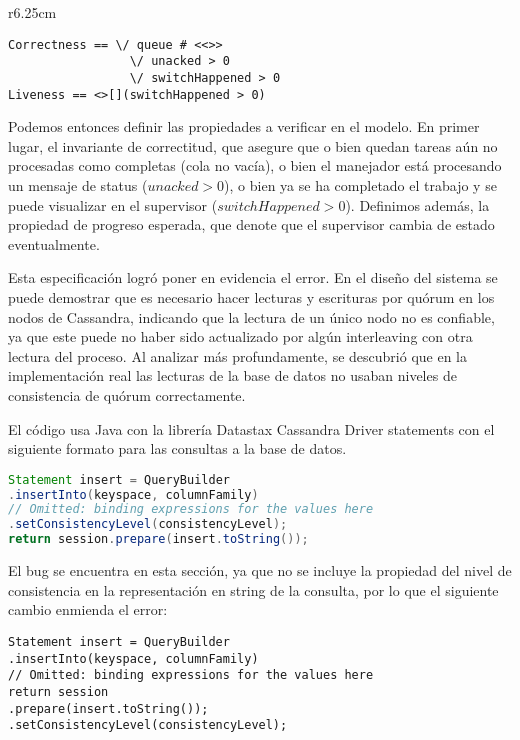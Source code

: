 \documentclass[runningheads]{llncs}
\begin{document}
\begin{wrapfigure}[7]{r}{6.25cm}
\vspace{-0.5cm}
\begin{lstlisting}
Correctness == \/ queue # <<>>
                 \/ unacked > 0
                 \/ switchHappened > 0    
Liveness == <>[](switchHappened > 0)
\end{lstlisting}
\end{wrapfigure}
Podemos entonces definir las propiedades a verificar en el modelo. En primer lugar, el invariante de correctitud, que asegure que o bien quedan tareas aún no procesadas como completas (cola no vacía), o bien el manejador está procesando un mensaje de status (\(unacked > 0\)), o bien ya se ha completado el trabajo y se puede visualizar en el supervisor (\(switchHappened > 0\)). Definimos además, la propiedad de progreso esperada, que denote que el supervisor cambia de estado eventualmente.

Esta especificación logró poner en evidencia el error. En el diseño del sistema se puede demostrar que es necesario hacer lecturas y escrituras por quórum en los nodos de Cassandra, indicando que la lectura de un único nodo no es confiable, ya que este puede no haber sido actualizado por algún interleaving con otra lectura del proceso. Al analizar más profundamente, se descubrió que en la implementación real las lecturas de la base de datos no usaban niveles de consistencia de quórum correctamente.

El código usa Java con la librería Datastax Cassandra Driver statements con el siguiente formato para las consultas a la base de datos.

\begin{lstlisting}[language=Java]
Statement insert = QueryBuilder
.insertInto(keyspace, columnFamily)
// Omitted: binding expressions for the values here
.setConsistencyLevel(consistencyLevel);
return session.prepare(insert.toString());
\end{lstlisting}

El bug se encuentra en esta sección, ya que no se incluye la propiedad del nivel de consistencia en la representación en string de la consulta, por lo que el siguiente cambio enmienda el error:
%
\begin{lstlisting}
Statement insert = QueryBuilder
.insertInto(keyspace, columnFamily)
// Omitted: binding expressions for the values here
return session
.prepare(insert.toString());
.setConsistencyLevel(consistencyLevel);
\end{lstlisting}
\end{document}
